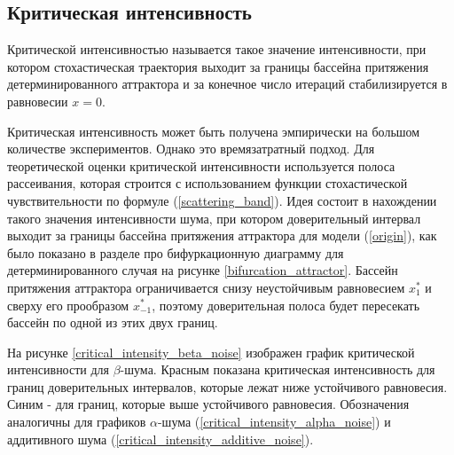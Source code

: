 \subsection{Критическая интенсивность}

    Критической интенсивностью называется такое значение интенсивности, при котором стохастическая траектория выходит за границы бассейна притяжения детерминированного аттрактора и за конечное число итераций стабилизируется в равновесии \(x = 0\).

    Критическая интенсивность может быть получена эмпирически на большом количестве экспериментов. Однако это времязатратный подход. Для теоретической оценки критической интенсивности используется полоса рассеивания, которая строится с использованием функции стохастической чувствительности по формуле (\ref{scattering_band}). Идея состоит в нахождении такого значения интенсивности шума, при котором доверительный интервал выходит за границы бассейна притяжения аттрактора для модели (\ref{origin}), как было показано в разделе про бифуркационную диаграмму для детерминированного случая на рисунке \ref{bifurcation_attractor}. Бассейн притяжения аттрактора ограничивается снизу неустойчивым равновесием \(x_1^*\) и сверху его прообразом \(x_{-1}^*\), поэтому доверительная полоса будет пересекать бассейн по одной из этих двух границ.

    На рисунке \ref{critical_intensity_beta_noise} изображен график критической интенсивности для \(\beta\)-шума. Красным показана критическая интенсивность для границ доверительных интервалов, которые лежат ниже устойчивого равновесия. Синим - для границ, которые выше устойчивого равновесия. Обозначения аналогичны для графиков \(\alpha\)-шума (\ref{critical_intensity_alpha_noise}) и аддитивного шума (\ref{critical_intensity_additive_noise}).


